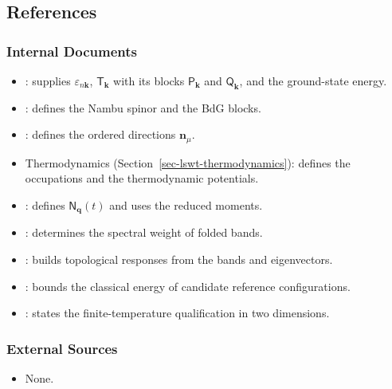 \subsection{References}

\subsubsection{Internal Documents}

\begin{itemize}
\tightlist
\item
  : supplies \(\varepsilon_{n\mathbf k}\), \(\mathsf T_{\mathbf k}\) with its blocks \(\mathsf P_{\mathbf k}\) and \(\mathsf Q_{\mathbf k}\), and the ground-state energy.
\item
  : defines the Nambu spinor and the BdG blocks.
\item
  : defines the ordered directions \(\mathbf n_\mu\).
\item
  Thermodynamics (Section~\ref{sec-lswt-thermodynamics}): defines the occupations and the thermodynamic potentials.
\item
  : defines \(\mathsf N_{\mathbf q}(t)\) and uses the reduced moments.
\item
  : determines the spectral weight of folded bands.
\item
  : builds topological responses from the bands and eigenvectors.
\item
  : bounds the classical energy of candidate reference configurations.
\item
  : states the finite-temperature qualification in two dimensions.
\end{itemize}

\subsubsection{External Sources}

\begin{itemize}
\tightlist
\item
  None.
\end{itemize}
